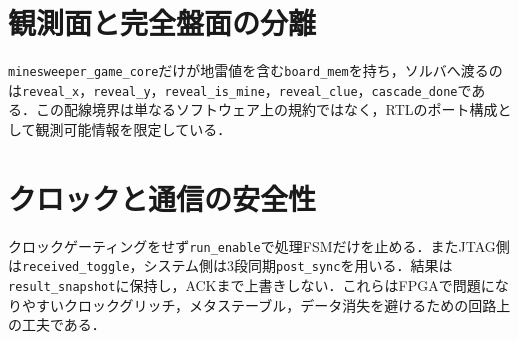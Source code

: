 \section{観測面と完全盤面の分離}
\texttt{minesweeper\_game\_core}だけが地雷値を含む\texttt{board\_mem}を持ち，ソルバへ渡るのは\texttt{reveal\_x}，\texttt{reveal\_y}，\texttt{reveal\_is\_mine}，\texttt{reveal\_clue}，\texttt{cascade\_done}である．この配線境界は単なるソフトウェア上の規約ではなく，RTLのポート構成として観測可能情報を限定している．

\section{クロックと通信の安全性}
クロックゲーティングをせず\texttt{run\_enable}で処理FSMだけを止める．またJTAG側は\texttt{received\_toggle}，システム側は3段同期\texttt{post\_sync}を用いる．結果は\texttt{result\_snapshot}に保持し，ACKまで上書きしない．これらはFPGAで問題になりやすいクロックグリッチ，メタステーブル，データ消失を避けるための回路上の工夫である．
